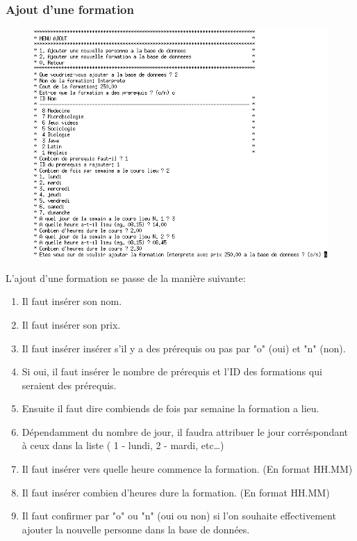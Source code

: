\documentclass[11pt]{article}
\begin{document}
\subsubsection{Ajout d'une formation}
\begin{figure}[ht]
  \centering
  \includegraphics[scale=0.7]{images/11.png.png}
\end{figure}
L'ajout d'une formation se passe de la manière suivante:
\begin{enumerate}
\item Il faut insérer son nom.
\item Il faut insérer son prix.
\item Il faut insérer insérer s'il y a des prérequis ou pas par "o" (oui) et "n" (non).
\item Si oui, il faut insérer le nombre de prérequis et l'ID des formations qui seraient des prérequis.
\item Ensuite il faut dire combiends de fois par semaine la formation a lieu.
\item Dépendamment du nombre de jour, il faudra attribuer le jour corréspondant à ceux dans la liste ( 1 - lundi, 2 - mardi, etc\ldots)
\item Il faut insérer vers quelle heure commence la formation. (En format HH.MM)
\item Il faut insérer combien d'heures dure la formation. (En format HH.MM)
\item Il faut confirmer par "o" ou "n" (oui ou non) si l'on souhaite effectivement ajouter la nouvelle personne dans la base de données.
\end{enumerate}
\end{document}
